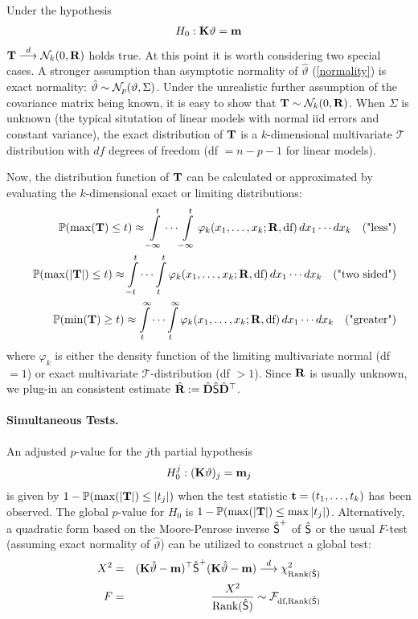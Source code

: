 \documentclass[12pt]{article}
\begin{document}
Under the hypothesis
\begin{eqnarray*}
H_0: \K \vartheta = \m
\end{eqnarray*}
$\T \cL \N_k(0, \Cor)$ holds true. At this point it is worth
considering two special cases. A stronger assumption than asymptotic normality
of $\hat{\vartheta}$ (\ref{normality}) is exact normality:
$\hat{\vartheta} \sim \N_p(\vartheta, \Sigma)$. Under the unrealistic
further assumption of the covariance matrix being known, it
is easy to show that $\T \sim \N_k(0, \Cor)$. 
When $\Sigma$ is unknown (the typical situtation of linear models
with normal iid errors and constant variance), the
exact distribution of $\T$ is a $k$-dimensional multivariate $\mathcal{T}$
distribution with $df$ degrees of freedom (df $ = n - p - 1$ for linear models).

Now, the distribution function of $\T$ can be calculated or approximated
by evaluating the $k$-dimensional exact or limiting distributions:
\begin{eqnarray*}
& & \Prob(\max(\T) \le t)  \approx \int\limits_{-\infty}^t \cdots \int\limits_{-\infty}^t 
\varphi_k(x_1, \dots, x_k; \Cor, \text{df}) \, dx_1 \cdots dx_k \quad \text{("less")}\\
& & \Prob(\max(|\T|) \le t)  \approx  \int\limits_{-t}^t \cdots \int\limits_{t}^t 
\varphi_k(x_1, \dots, x_k; \Cor, \text{df}) \, dx_1 \cdots dx_k \quad \text{("two sided")}\\
& & \Prob(\min(\T) \ge t) \approx  \int\limits_{t}^\infty \cdots \int\limits_{t}^\infty 
\varphi_k(x_1, \dots, x_k; \Cor, \text{df}) \, dx_1 \cdots dx_k \quad \text{("greater")}\\
\end{eqnarray*}
where $\varphi_k$ is either the density function of the limiting multivariate
normal (df $ = 1$) or exact multivariate $\mathcal{T}$-distribution (df $ > 1$).
Since $\Cor$ is usually unknown, we plug-in an consistent estimate
$\hat{\Cor} := \hat{\D} \hat{\S} \hat{\D}^\top$.

\paragraph{Simultaneous Tests.}

An adjusted $p$-value for the $j$th partial hypothesis 
\begin{eqnarray*}
H_0^j: (\K \vartheta)_j = \m_j
\end{eqnarray*}
is given by $1 - \Prob(\max(|\T|) \le |t_j|)$ when the test statistic 
$\tt  = (t_1, \dots, t_k)$
has been observed. The global $p$-value for $H_0$ is $1 - \Prob(\max(|\T|) \le \max|t_j|)$.
Alternatively, a quadratic form based on the Moore-Penrose inverse $\hat{\S}^+$ of 
$\hat{\S}$ or the usual $F$-test (assuming exact normality of $\hat{\vartheta}$) 
can be utilized to construct a global test:
\begin{eqnarray*}
X^2 & = & (\K \hat{\vartheta} - \m)^\top \hat{\S}^+ (\K \hat{\vartheta} - \m) \cL \chi^2_{\Rg(\hat{\S})} \\
F & = &  \frac{X^2}{\Rg(\hat{\S})} \sim \F_{\text{df}, \Rg(\hat{\S})}
\end{eqnarray*}
\end{document}
